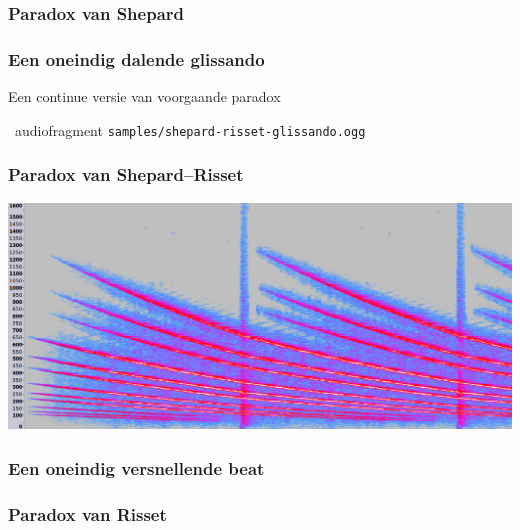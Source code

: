 \documentclass[compress, darktitle, framenumber, totalframenumber]{beamer}
\begin{document}
\begin{frame}
  \frametitle{Paradox van Shepard}
\end{frame}

\begin{frame}
  \frametitle{Een oneindig dalende glissando}

  Een continue versie van voorgaande paradox
  \begin{block}{\twonotes\ audiofragment}
    \texttt{samples/shepard-risset-glissando.ogg}
  \end{block}
\end{frame}

\begin{frame}
  \frametitle{Paradox van Shepard--Risset}

  \includegraphics[width=\textwidth]{images/glissando-spectrum.png}
\end{frame}

\begin{frame}
  \frametitle{Een oneindig versnellende beat}
\end{frame}

\begin{frame}
  \frametitle{Paradox van Risset}
\end{frame}
\end{document}
